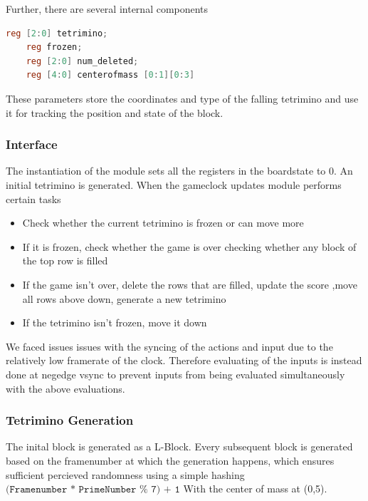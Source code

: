 Further, there are several internal components 
\begin{lstlisting}[language=Verilog]
    reg [2:0] tetrimino;
    reg frozen;
    reg [2:0] num_deleted;
    reg [4:0] centerofmass [0:1][0:3]
\end{lstlisting}
These parameters store the coordinates and type of the falling 
tetrimino and use it for tracking the position and state of the block.

\subsubsection{Interface}
\label{subsubsection:interface}
The instantiation of the module sets all the registers in the boardstate to 0. An initial tetrimino is generated.
\newline 
When the gameclock updates module performs certain tasks 
\begin{itemize}
    \item Check whether the current tetrimino is frozen or can move more
    \item If it is frozen, check whether the game is over checking whether any block of the top row is filled
    \item If the game isn't over, delete the rows that are filled, update the score ,move all rows above down, generate a new tetrimino
    \item If the tetrimino isn't frozen, move it down 
\end{itemize}
We faced issues issues with the syncing of the actions and input due to the relatively low framerate of the clock. 
Therefore evaluating of the inputs is instead done at negedge vsync to prevent inputs 
from being evaluated simultaneously with the above evaluations.
\subsubsection{Tetrimino Generation }
\label{subsubsection:tetgen}
The inital block is generated as a L-Block. 
Every subsequent block is generated based on the framenumber 
at which the generation happens, which ensures sufficient percieved 
randomness using a simple hashing
 \( \texttt{(Framenumber * PrimeNumber\ \%\ 7) + 1} \) 
With the center of mass at (0,5).
